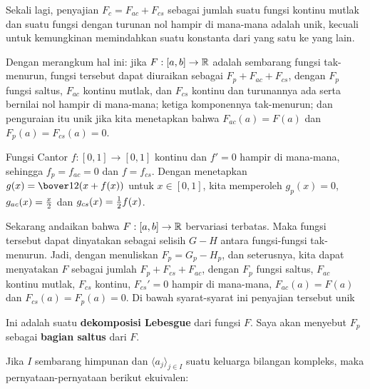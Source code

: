 Sekali lagi, penyajian $F_c=F_{ac}+F_{cs}$ sebagai jumlah suatu fungsi kontinu
mutlak dan suatu fungsi dengan turunan nol hampir di mana-mana adalah unik,
kecuali untuk kemungkinan memindahkan suatu konstanta dari yang satu ke yang
lain.

 Dengan merangkum hal ini:  jika
$F:[a,b]\to\Bbb R$ adalah sembarang
fungsi tak-menurun, fungsi tersebut dapat diuraikan sebagai $F_p+F_{ac}+F_{cs}$, dengan
$F_p$ fungsi saltus, $F_{ac}$ kontinu mutlak, dan
$F_{cs}$ kontinu dan turunannya ada serta bernilai nol hampir di
mana-mana;  ketiga komponennya tak-menurun;  dan penguraian itu
unik jika kita menetapkan bahwa $F_{ac}(a)=F(a)$ dan
$F_p(a)=F_{cs}(a)=0$.

Fungsi Cantor $f:[0,1]\to[0,1]$ kontinu dan
$f'=0$ hampir di mana-mana, sehingga $f_p=f_{ac}=0$ dan $f=f_{cs}$.
Dengan menetapkan $g(x)=\bover12(x+f(x))$ untuk $x\in[0,1]$,
kita memperoleh $g_p(x)=0$, $g_{ac}(x)={x\over 2}$ dan
$g_{cs}(x)={1\over 2}f(x)$.

 Sekarang andaikan bahwa $F:[a,b]\to\Bbb R$
bervariasi terbatas.
Maka fungsi tersebut dapat dinyatakan sebagai selisih $G-H$ antara
fungsi-fungsi tak-menurun.   Jadi, dengan menuliskan $F_p=G_p-H_p$,
dan seterusnya, kita dapat menyatakan $F$ sebagai jumlah $F_p+F_{cs}+F_{ac}$, dengan $F_p$
fungsi saltus, $F_{ac}$ kontinu mutlak, $F_{cs}$
kontinu, $F_{cs}'=0$ hampir di mana-mana, $F_{ac}(a)=F(a)$ dan $F_{cs}(a)=F_{p}(a)=0$.
Di bawah syarat-syarat ini penyajian tersebut unik

Ini adalah suatu {\bf dekomposisi Lebesgue} dari fungsi $F$.
   Saya akan menyebut $F_p$ sebagai {\bf bagian saltus} dari $F$.

  Jika $I$ sembarang himpunan dan
$\langle a_j\rangle_{j\in I}$ suatu keluarga bilangan kompleks, maka
pernyataan-pernyataan berikut ekuivalen:

